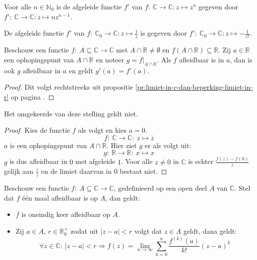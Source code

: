 \documentclass[main.tex]{subfiles}
\begin{document}

\begin{vb}
  Voor alle $n \in \mathbb{N}_{0}$ is de afgeleide functie $f'$ van $f:\ \mathbb{C} \rightarrow \mathbb{C}: z \mapsto z^{n}$ gegeven door $f':\ \mathbb{C} \rightarrow \mathbb{C}: z \mapsto nz^{n-1}$.
\end{vb}

\begin{vb}
  De afgeleide functie $f'$ van $f:\ \mathbb{C}_{0} \rightarrow \mathbb{C}: z \mapsto \frac{1}{z}$ is gegeven door $f':\ \mathbb{C}_{0} \rightarrow \mathbb{C}: z \mapsto -\frac{1}{z^{2}}$.
\end{vb}

\begin{bpr}
  Beschouw een functie $f:\ A \subseteq \mathbb{C} \rightarrow \mathbb{C}$ met $A \cap \mathbb{R} \neq \emptyset$ en $f(A \cap \mathbb{R})\subseteq \mathbb{R}$.
  Zij $a \in \mathbb{R}$ een ophopingspunt van $A \cap \mathbb{R}$ en noteer $g=f|_{A \cap \mathbb{R}}$.
  Als $f$ afleidbaar is in $a$, dan is ook $g$ afleidbaar in $a$ en geldt $g'(a)=f'(a)$.

  \begin{proof}
    Dit volgt rechtstreeks uit propositie \ref{pr:limiet-in-c-dan-beperking-limiet-in-r} op pagina \pageref{pr:limiet-in-c-dan-beperking-limiet-in-r}.
  \end{proof}
\end{bpr}

\begin{tvb}
  Het omgekeerde van deze stelling geldt niet.

  \begin{proof}
    Kies de functie $f$ als volgt en kies $a=0$.
    \[ f:\ \mathbb{C} \rightarrow \mathbb{C}:\ z \mapsto \overline{z} \]
    $a$ is een ophopingspunt van $A \cap \mathbb{R}$.
    Hier ziet $g$ er als volgt uit:
    \[ g:\ \mathbb{R} \rightarrow \mathbb{R}:\ x \mapsto x \]
    $g$ is dus afleidbaar in $0$ met afgeleide $1$.
    Voor alle $z \neq 0$ in $\mathbb{C}$ is echter $\frac{f(z)-f(0)}{z}$ gelijk aan $\frac{\overline{z}}{z}$ en de limiet daarvan in $0$ bestaat niet.
  \end{proof}
\end{tvb}


\begin{bst}
  Beschouw een functie $f:\ A \subseteq \mathbb{C} \rightarrow \mathbb{C}$, gedefinieerd op een open deel $A$ van $\mathbb{C}$.
  Stel dat $f$ \'e\'en maal afleidbaar is op $A$, dan geldt:
  \begin{itemize}
  \item $f$ is oneindig keer afleidbaar op $A$.
  \item Zij $a\in A$, $r\in \mathbb{R}_{0}^{+}$ zodat uit $|z-a|< r$ volgt dat $z\in A$ geldt, dana geldt:
    \[ \forall z\in \mathbb{C}:\ |z-a|< r \Rightarrow f(z) = \lim_{n \rightarrow \infty}\sum_{k=0}^{n}\frac{f^{(k)}(a)}{k!}(z-a)^{k} \]
  \end{itemize}
\zb
\end{bst}
\end{document}
